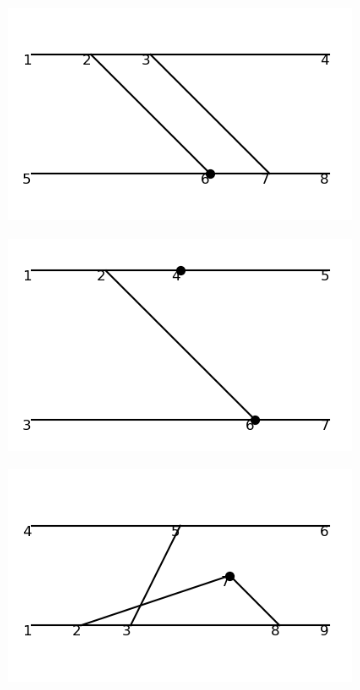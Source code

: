 \documentclass[11pt,a4paper,twoside,pdf]{article}
\numberwithin{equation}{section}
\begin{document}
\begin{figure}[h!]
\begin{subfigure}[t]{0.16\textwidth}
    \end{subfigure}
    \hfill
    \begin{subfigure}[t]{0.16\textwidth}
        \centering
        \includegraphics[width=\textwidth]{plots/order6_2to2/counterterms/7.png}
    \end{subfigure}
    \hfill
    \begin{subfigure}[t]{0.16\textwidth}
        \centering
        \includegraphics[width=\textwidth]{plots/order6_2to2/counterterms/8.png}
    \end{subfigure}
    \hfill 
    \begin{subfigure}[t]{0.16\textwidth}
        \centering
        \includegraphics[width=\textwidth]{plots/order6_2to2/counterterms/9.png}

\end{subfigure}
\end{figure}
\end{document}
